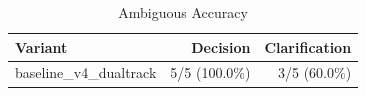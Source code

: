 \begin{table}[htbp]
\centering
\caption{Ambiguous Accuracy}
\label{tab:acc-ambig}
\begin{tabular}{l rr}
\toprule
Variant & Decision & Clarification \\
\midrule
  baseline\_v4\_dualtrack & 5/5 (100.0\%) & 3/5 (60.0\%) \\
\bottomrule
\end{tabular}
\end{table}
